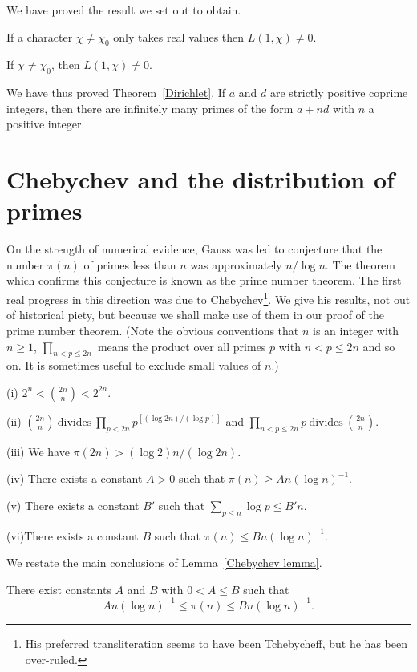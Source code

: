 We have proved the result we set out to obtain.
\begin{lemma} If a character $\chi\neq\chi_{0}$
only takes real values
then $L(1,\chi)\neq 0$.
\end{lemma}
\begin{theorem} If $\chi\neq\chi_{0}$, then $L(1,\chi)\neq 0$.
\end{theorem}
We have thus proved Theorem~\ref{Dirichlet}.
If $a$ and $d$ are strictly
positive coprime integers, then there are infinitely
many primes of the form $a+nd$ with $n$ a positive integer.
\section{Chebychev and the distribution of primes}
On the strength of numerical evidence, Gauss was
led to conjecture that the number $\pi(n)$
of primes less than $n$
was approximately $n/\log n$. The theorem which
confirms this conjecture is known as the
prime number theorem.
The first real
progress in this direction was due to
Chebychev\footnote{His preferred transliteration
seems to have been Tchebycheff, but he has
been over-ruled.}. We give his results, not out
of historical piety, but because we shall make
use of them in our proof of the prime number
theorem. (Note the obvious conventions that
$n$ is an integer with $n\geq 1$,
$\prod_{n<p\leq 2n}$ means the product over all primes
$p$ with $n<p\leq 2n$ and so on. It is sometimes
useful to exclude small values of $n$.)
\begin{lemma}\label{Chebychev lemma} (i) ${\displaystyle
2^{n}<\binom{2n}{n}<2^{2n}}$.

(ii) ${\displaystyle \binom{2n}{n}\ \text{divides}
\ \prod_{p<2n} p^{[(\log 2n)/(\log p)]}}$
and
${\displaystyle \prod_{n<p\leq 2n} p\ \text{divides}
\ \binom{2n}{n}}$.

(iii) We have $\pi(2n)>(\log 2)n/(\log 2n)$.

(iv)  There exists a constant $A>0$ such that
$\pi(n)\geq An(\log n)^{-1}$.

(v) There exists a constant $B'$ such that
$\sum_{p\leq n} \log p\leq B'n$.

(vi)There exists a constant $B$ such that
$\pi(n)\leq Bn(\log n)^{-1}$.
\end{lemma}
We restate the main conclusions of Lemma~\ref{Chebychev lemma}.
\begin{theorem}[Chebychev]\label{Chebychev theorem}
There exist constants $A$ and $B$
with $0<A\leq B$ such that
\[An(\log n)^{-1}\leq\pi(n)\leq Bn(\log n)^{-1}.\]
\end{theorem}

